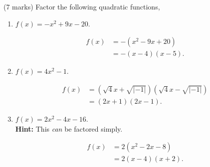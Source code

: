 \documentclass[12pt]{article} %
\begin{document}
\begin{qstn}
  (7 marks) Factor the following quadratic functions,
  \begin{enumerate}[label=(\alph*)]
    \item $f\left( x \right) = -x ^2 +9x -20$.
      \begin{solution}
        \begin{align*}
          f(x) &= -\left( x^2 - 9x + 20 \right) \\
               &= -(x-4)(x-5)
        .\end{align*}
      \end{solution}

    \item $f(x) = 4x^2 - 1$.
      \begin{solution}
        \begin{align*}
          f(x) &= \left(\sqrt{4}x + \sqrt{\left|-1\right|}   \right) \left( \sqrt{4} x - \sqrt{\left|-1\right|}  \right)\\
               &= (2x + 1)(2x - 1)
        .\end{align*}
      \end{solution}

    \item $f\left( x \right) = 2x^2 - 4x - 16$.\\
      \textbf{Hint:} This \emph{can} be factored simply.
      \begin{solution}
        \begin{align*}
          f(x) &= 2\left( x^2 - 2x - 8 \right) \\
               &= 2(x - 4)(x + 2)
        .\end{align*}
      \end{solution}
  \end{enumerate}
\end{qstn}

\newpage
\end{document}
